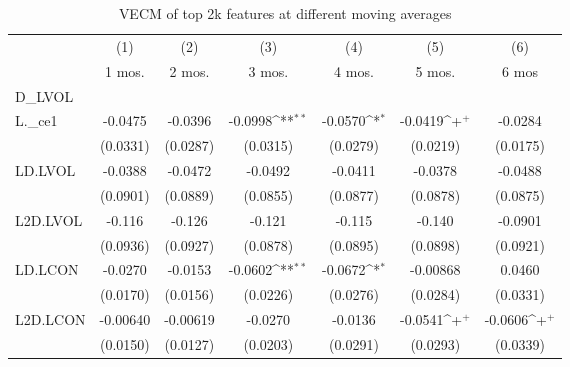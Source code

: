 \begin{table}
\begin{center}
\caption[VECM Results Top 2k Features Diff. K]{VECM of top 2k features at different  moving averages\label{vec4}}
\vspace{0.3in}
{
\def\sym#1{\ifmmode^{#1}\else\(^{#1}\)\fi}
\begin{tabular}{l*{6}{c}}
\hline\hline
          &\multicolumn{1}{c}{(1)}&\multicolumn{1}{c}{(2)}&\multicolumn{1}{c}{(3)}&\multicolumn{1}{c}{(4)}&\multicolumn{1}{c}{(5)}&\multicolumn{1}{c}{(6)}\\
          &\multicolumn{1}{c}{1 mos.}&\multicolumn{1}{c}{2 mos.}&\multicolumn{1}{c}{3 mos.}&\multicolumn{1}{c}{4 mos.}&\multicolumn{1}{c}{5 mos.}&\multicolumn{1}{c}{6 mos}\\
\hline
D\_LVOL    &                  &                  &                  &                  &                  &                  \\
L.\_ce1    &  -0.0475         &  -0.0396         &  -0.0998\sym{**} &  -0.0570\sym{*}  &  -0.0419\sym{+}  &  -0.0284         \\
          & (0.0331)         & (0.0287)         & (0.0315)         & (0.0279)         & (0.0219)         & (0.0175)         \\
LD.LVOL   &  -0.0388         &  -0.0472         &  -0.0492         &  -0.0411         &  -0.0378         &  -0.0488         \\
          & (0.0901)         & (0.0889)         & (0.0855)         & (0.0877)         & (0.0878)         & (0.0875)         \\
L2D.LVOL  &   -0.116         &   -0.126         &   -0.121         &   -0.115         &   -0.140         &  -0.0901         \\
          & (0.0936)         & (0.0927)         & (0.0878)         & (0.0895)         & (0.0898)         & (0.0921)         \\
LD.LCON   &  -0.0270         &  -0.0153         &  -0.0602\sym{**} &  -0.0672\sym{*}  & -0.00868         &   0.0460         \\
          & (0.0170)         & (0.0156)         & (0.0226)         & (0.0276)         & (0.0284)         & (0.0331)         \\
L2D.LCON  & -0.00640         & -0.00619         &  -0.0270         &  -0.0136         &  -0.0541\sym{+}  &  -0.0606\sym{+}  \\
          & (0.0150)         & (0.0127)         & (0.0203)         & (0.0291)         & (0.0293)         & (0.0339)         \\

\end{tabular}}
\end{center}
\end{table}
